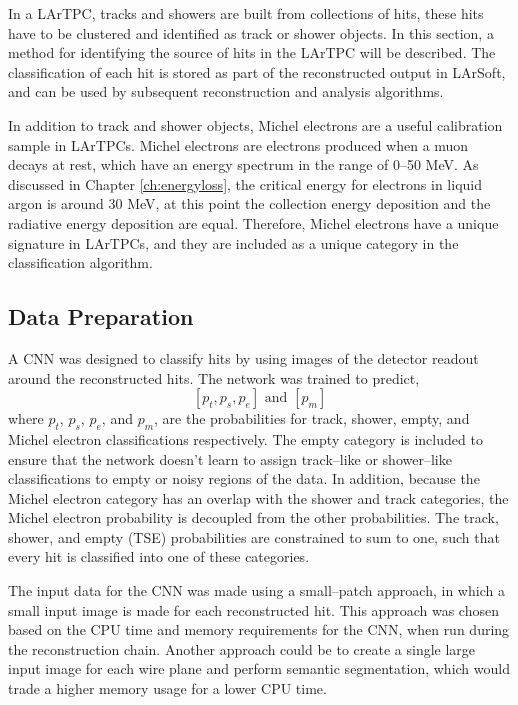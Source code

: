 In a LArTPC, tracks and showers are built from collections of hits, these hits
have to be clustered and identified as track or shower objects. In this section,
a method for identifying the source of hits in the \protodune{} LArTPC will 
be described. The classification of each hit is stored as part of the 
reconstructed output in LArSoft, and can be used by subsequent reconstruction 
and analysis algorithms.

In addition to track and shower objects, Michel electrons are a useful 
calibration sample in LArTPCs. Michel electrons are electrons produced when a 
muon decays at rest, which have an energy spectrum in the range of 0--50 MeV. 
As discussed in Chapter \ref{ch:energyloss}, the critical energy for electrons 
in liquid argon is around 30 MeV, at this point the collection energy deposition 
and the radiative energy deposition are equal. Therefore, Michel electrons 
have a unique signature in LArTPCs, and they are included as a unique category 
in the classification algorithm.

\subsection{Data Preparation}

A CNN was designed to classify hits by using images of the detector readout
around the reconstructed hits. The network was trained to predict,
\begin{equation*}
	\left[ p_t, p_s, p_e \right] \mbox{ and } \left[ p_m \right]
\end{equation*}
where $p_t$, $p_s$, $p_e$, and $p_m$, are the probabilities for track, shower,
empty, and Michel electron classifications respectively. The empty category is
included to ensure that the network doesn't learn to assign track--like or
shower--like classifications to empty or noisy regions of the data. In addition,
because the Michel electron category has an overlap with the shower and track
categories, the Michel electron probability is decoupled from the other 
probabilities. The track, shower, and empty (TSE) probabilities are 
constrained to sum to one, such that every hit is classified into one of these 
categories.

The input data for the CNN was made using a small--patch approach, in
which a small input image is made for each reconstructed hit. This approach was
chosen based on the CPU time and memory requirements for the CNN, when run 
during the \protodune{} reconstruction chain. Another approach could be to 
create a single large input image for each wire plane and perform semantic 
segmentation, which would trade a higher memory usage for a lower CPU time.

